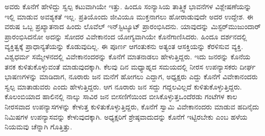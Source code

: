 ಅವರು ಕೊನೆಗೆ ಹೇಳಿದ್ದು ಸ್ವಲ್ಪ ಕಟುವಾಗಿಯೇ ಇತ್ತು. ಹಿಂದೂ ಸಂನ್ಯಾಸಿಯ ತಾತ್ತ್ವಿಕ ಭಾವನೆಗಳ ವಿಶ್ಲೇಷಣೆಯನ್ನು ಇಲ್ಲಿ ಮಾಡುವ ಅವಶ್ಯಕತೆ ಇಲ್ಲ. ಪ್ರತಿಯೊಂದು ಜೀವಿಯೂ ಮುಕ್ತನಾಗಲು ಹೋರಾಡುವುದೇ ಅದರ ಉದ್ದೇಶ. ಈ ವರುಷ ಒಬ್ಬ ಪ್ರಖ್ಯಾತನಾದ ಹಿಂದು ಲೊವೆಲ್​ ಇನ್​ಸ್ಟಿಟ್ಯೂಟ್​ ಪ್ರಾರಂಭಿಸಿದನು. ಯಾವುದನ್ನು ಮಿಸ್ಟರ್​ ಮುಜುಂದಾರ್​ ಪ್ರಾರಂಭಿಸಿದನೋ ಅದನ್ನು ಸೋದರ ವಿವೇಕಾನಂದ ಯೋಗ್ಯವಾಗಿಯೇ ಕೊನೆಗಾಣಿಸಿದರು. ಹಿಂದೂ ದರ್ಶನದಲ್ಲಿ ವ್ಯಕ್ತಿತ್ವಕ್ಕೆ ಪ್ರಾಧಾನ್ಯತೆಯನ್ನು ಕೊಡುವುದಿಲ್ಲ. ಈ ಪೂರ್ಣ ಆಗಂತುಕನು ಅತ್ಯಂತ ಆಸಕ್ತಿಯನ್ನು ಕೆರಳಿಸುವ ವ್ಯಕ್ತಿ. ವಿಶ್ವಧರ್ಮ ಸಮ್ಮೇಳನದಲ್ಲಿ ವಿವೇಕಾನಂದರನ್ನು ಕೊನೆಗೆ ಮಾತನಾಡಲು ಹೇಳುತ್ತಿದ್ದರು. ಇದು ಜನರನ್ನು ಕೊನೆಯ ತನಕ ಕುಳಿತುಕೊಳ್ಳುವಂತೆ ಮಾಡುವುದಕ್ಕಾಗಿ. ಕೆಲವು ದಿನ ಮಧ್ಯಾಹ್ನದ ಸಮಯದಲ್ಲಿ ನೀರಸ ಉಪನ್ಯಾಸಕರು ದೀರ್ಘ ಭಾಷಣಗಳನ್ನು ಮಾಡಿದಾಗ, ನೂರಾರು ಜನ ಮನೆಗೆ ಹೋಗಲು ಎದ್ದಾಗ, ಅಧ್ಯಕ್ಷರು ಎದ್ದು ಕೊನೆಗೆ ವಿವೇಕಾನಂದರು ಸ್ವಲ್ಪ ಮಾತಾಡುವರು ಎಂದು ಹೇಳುತ್ತಿದ್ದರು. ಆಗ ನೂರಾರು ಜನ ಸದ್ದು ಗದ್ದಲವಿಲ್ಲದೆ ಕುಳಿತುಕೊಳ್ಳುತ್ತಿದ್ದರು. ಕೊಲಂಬಿಯಾದ ಹಾಲಿನಲ್ಲಿ ನಾಲ್ಕು ಸಾವಿರ ಜನ ಬೀಸಣಿಗೆಯಿಂದ ಬೀಸಿಕೊಳ್ಳುತ್ತ\break ಒಂದೆರಡು ಗಂಟೆಗಳ ಕಾಲ ನೀರಸವಾದ ಉಪನ್ಯಾಸಗಳನ್ನು ಕೇಳುತ್ತ ಕುಳಿತುಕೊಳ್ಳುತ್ತಿದ್ದರು, ಕೊನೆಗೆ ಸ್ವಾಮಿ ವಿವೇಕಾನಂದರು ಮಾಡುವ ಹದಿನೈದು ನಿಮಿಷಗಳ ಉಪನ್ಯಾಸವನ್ನು ಕೇಳುವುದಕ್ಕಾಗಿ. ಅಧ್ಯಕ್ಷರಿಗೆ ಶ್ರೇಷ್ಠವಾದುದನ್ನು ಕೊನೆಗೆ ಇಟ್ಟಿರಬೇಕು ಎಂಬ ಹಳೆಯ ನಿಯಮವು ಚೆನ್ನಾಗಿ ಗೊತ್ತಿತ್ತು.

